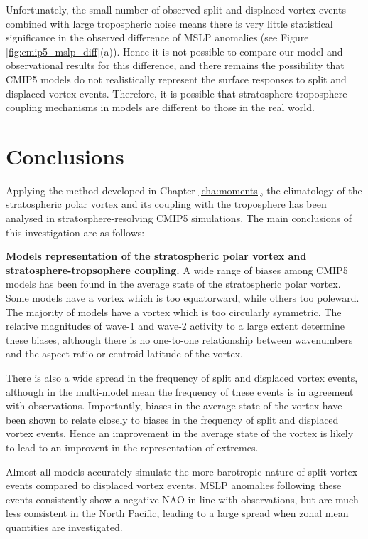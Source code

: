 Unfortunately, the small number of observed split and displaced vortex events
combined with large tropospheric noise means there is very little statistical
significance in the observed difference of MSLP anomalies (see Figure
\ref{fig:cmip5_mslp_diff}(a)). Hence it is not possible to compare our model and
observational results for this difference, and there remains the
possibility that CMIP5 models do not realistically represent the surface
responses to split and displaced vortex events. Therefore, it is possible that
stratosphere-troposphere coupling mechanisms in models are different to those in
the real world. 

\section{Conclusions}

Applying the method developed in Chapter \ref{cha:moments}, the climatology of
the stratospheric polar vortex and its coupling with the troposphere has been
analysed in stratosphere-resolving CMIP5 simulations. The main conclusions of
this investigation are as follows:


\bigskip\noindent\textbf{Models representation of the stratospheric polar vortex and
  stratosphere-tropsophere coupling.} A wide range of biases among CMIP5 models
has been found in the average state of the stratospheric polar vortex. Some
models have a vortex which is too equatorward, while others too poleward. The
majority of models have a vortex which is too circularly symmetric. The relative
magnitudes of wave-1 and wave-2 activity to a large extent determine
these biases, although there is no one-to-one relationship between wavenumbers
and the aspect ratio or centroid latitude of the vortex. 

There is also a wide spread in the frequency of split and displaced vortex
events, although in the multi-model mean the frequency of these events is in
agreement with observations. Importantly, biases in the average state of the
vortex have been shown to relate closely to biases in the frequency of split and
displaced vortex events. Hence an improvement in the average state of the vortex
is likely to lead to an improvent in the representation of extremes.

Almost all models accurately simulate the more barotropic nature of split vortex
events compared to displaced vortex events. MSLP anomalies following these
events consistently show a negative NAO in line with observations, but are much
less consistent in the North Pacific, leading to a large spread when zonal mean
quantities are investigated. 



